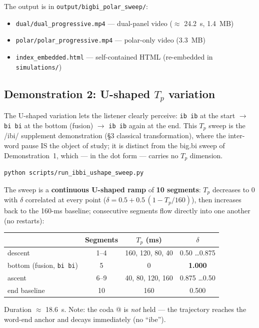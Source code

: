 \documentclass[11pt,a4paper]{article}
\begin{document}
The output is in \texttt{output/bigbi\_polar\_sweep/}:
\begin{itemize}
\item \texttt{dual/dual\_progressive.mp4} --- dual-panel video
  ($\approx$ 24.2~s, 1.4~MB)
\item \texttt{polar/polar\_progressive.mp4} --- polar-only video (3.3~MB)
\item \texttt{index\_embedded.html} --- self-contained HTML
  (re-embedded in \texttt{simulations/})
\end{itemize}

\subsection{Demonstration 2: U-shaped $T_p$ variation}

The U-shaped variation lets the listener clearly perceive:
\texttt{ib ib} at the start $\to$ \texttt{bi bi} at the bottom
(fusion) $\to$ \texttt{ib ib} again at the end. This $T_p$ sweep is
the /ibi/ supplement demonstration (\S3 classical transformation),
where the inter-word pause IS the object of study; it is distinct
from the big.bi sweep of Demonstration~1, which --- in the dot form ---
carries no $T_p$ dimension.

\begin{lstlisting}[language=bash]
python scripts/run_ibbi_ushape_sweep.py
\end{lstlisting}

The sweep is a \textbf{continuous U-shaped ramp} of \textbf{10
segments}: $T_p$ decreases to 0 with $\delta$ correlated at every
point ($\delta = 0.5 + 0.5\,(1 - T_p/160)$), then increases back to
the 160-ms baseline; consecutive segments flow directly into one
another (no restarts):
\begin{center}
\begin{tabular}{lccc}
\toprule
 & Segments & $T_p$ (ms) & $\delta$ \\
\midrule
descent & 1--4 & 160, 120, 80, 40 & 0.50 \dots 0.875 \\
bottom (fusion, \texttt{bi bi}) & 5 & 0 & \textbf{1.000} \\
ascent & 6--9 & 40, 80, 120, 160 & 0.875 \dots 0.50 \\
end baseline & 10 & 160 & 0.500 \\
\bottomrule
\end{tabular}
\end{center}
Duration $\approx$ 18.6~s. Note: the coda @ is \emph{not} held --- the
trajectory reaches the word-end anchor and decays immediately (no
``ibe'').
\end{document}
